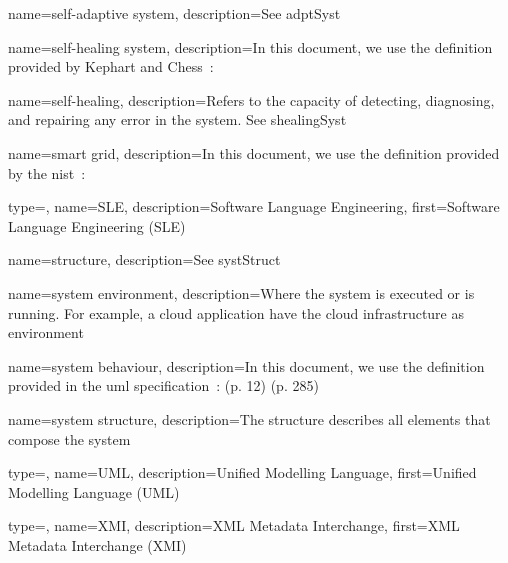 {
	name={self-adaptive system},
	description={See \gls{adptSyst}}
}

{
	name={self-healing system},
	description={In this document, we use the definition provided by Kephart and Chess~\cite{DBLP:journals/computer/KephartC03}: }
}

{
	name={self-healing},
	description={Refers to the capacity of detecting, diagnosing, and repairing any error in the system. See \gls{shealingSyst}}
}

{
	name={smart grid},
	description={In this document, we use the definition provided by the \gls{nist}~\cite{NIST:SmartGrid:Def:What}: }
}

{
	type=\acronymtype,
	name={SLE},
	description={Software Language Engineering},
	first={Software Language Engineering (SLE)}
}

{
	name={structure},
	description={See \gls{systStruct}}
}

{
	name={system environment},
	description={Where the system is executed or is running. For example, a cloud application have the cloud infrastructure as environment}
}

{
	name={system behaviour},
	description={In this document, we use the definition provided in the \gls{uml} specification~\cite{omg2017umlspec}: (p. 12) (p. 285)}
}

{
	name={system structure},
	description={The structure describes all elements that compose the system}
}

{
	type=\acronymtype,
	name={UML},
	description={Unified Modelling Language},
	first={Unified Modelling Language (UML)}
}

{
	type=\acronymtype,
	name={XMI},
	description={XML Metadata Interchange},
	first={XML Metadata Interchange (XMI)}
}


